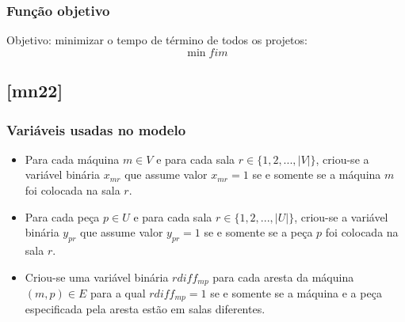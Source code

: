 \documentclass[11pt,letterpaper]{article}
\begin{document}
\subsubsection*{Função objetivo}
Objetivo: minimizar o tempo de término de todos os projetos:
\begin{equation}
\min fim
\end{equation}


\subsection{{[}mn22{]}}
\subsubsection*{Variáveis usadas no modelo}
\begin{itemize}
\item Para cada máquina $m \in V$ e para cada sala $r \in
  \{1,2,...,|V|\}$, criou-se a variável binária $x_{mr}$ que assume valor
  $x_{mr}=1$ se e somente se  a máquina $m$
  foi colocada na sala $r$.


\item Para cada peça $p \in U$ e para cada sala $r \in
  \{1,2,...,|U|\}$, criou-se a variável binária $y_{pr}$ que assume valor
  $y_{pr}=1$ se e somente se a peça $p$  foi colocada na sala $r$.

\item Criou-se uma variável binária $rdiff_{mp}$ para
  cada aresta da máquina $(m,p) \in  E$ para a qual
  $rdiff_{mp}=1$ se e somente se a máquina e a peça especificada pela aresta estão em salas diferentes.

\end{itemize}
\end{document}
